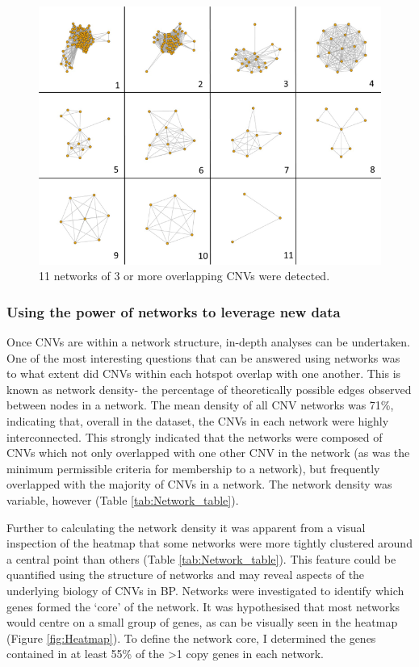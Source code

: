 \documentclass{article}
\begin{document}
\begin{figure}[h!]
\centering
\includegraphics[width=\textwidth{}]{Chapter_1/Networks all.png}
\caption{ 11 networks of 3 or more overlapping CNVs were detected.}
\label{fig:Networks_all}
\end{figure}

\subsubsection{Using the power of networks to leverage new data }
Once CNVs are within a network structure, in-depth analyses can be undertaken. One of the most interesting questions that can be answered using networks was to what extent did CNVs within each hotspot overlap with one another. This is known as network density- the percentage of theoretically possible edges observed between nodes in a network. The mean density of all CNV networks was 71\%, indicating that, overall in the dataset, the CNVs in each network were highly interconnected. This strongly indicated that the networks were composed of CNVs which not only overlapped with one other CNV in the network (as was the minimum permissible criteria for membership to a network), but frequently overlapped with the majority of CNVs in a network. The network density was variable, however (Table \ref{tab:Network_table}).

Further to calculating the network density it was apparent from a visual inspection of the heatmap that some networks were more tightly clustered around a central point than others (Table \ref{tab:Network_table}). This feature could be quantified using the structure of networks and may reveal aspects of the underlying biology of CNVs in BP. Networks were investigated to identify which genes formed the ‘core’ of the network. It was hypothesised that most networks would centre on a small group of genes, as can be visually seen in the heatmap (Figure \ref{fig:Heatmap}). To define the network core, I determined the genes contained in at least 55\% of the >1 copy genes in each network. 
\end{document}

